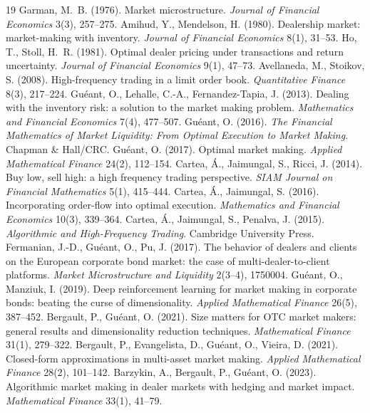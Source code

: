 \documentclass[11pt]{article}
\begin{document}
\begin{thebibliography}{19}
 Garman, M.~B. (1976). Market microstructure. \emph{Journal of Financial Economics} 3(3), 257--275.
 Amihud, Y., Mendelson, H. (1980). Dealership market: market-making with inventory. \emph{Journal of Financial Economics} 8(1), 31--53.
 Ho, T., Stoll, H.~R. (1981). Optimal dealer pricing under transactions and return uncertainty. \emph{Journal of Financial Economics} 9(1), 47--73.
 Avellaneda, M., Stoikov, S. (2008). High-frequency trading in a limit order book. \emph{Quantitative Finance} 8(3), 217--224.
 Gu\'eant, O., Lehalle, C.-A., Fernandez-Tapia, J. (2013). Dealing with the inventory risk: a solution to the market making problem. \emph{Mathematics and Financial Economics} 7(4), 477--507.
 Gu\'eant, O. (2016). \emph{The Financial Mathematics of Market Liquidity: From Optimal Execution to Market Making}. Chapman \& Hall/CRC.
 Gu\'eant, O. (2017). Optimal market making. \emph{Applied Mathematical Finance} 24(2), 112--154.
 Cartea, \'A., Jaimungal, S., Ricci, J. (2014). Buy low, sell high: a high frequency trading perspective. \emph{SIAM Journal on Financial Mathematics} 5(1), 415--444.
 Cartea, \'A., Jaimungal, S. (2016). Incorporating order-flow into optimal execution. \emph{Mathematics and Financial Economics} 10(3), 339--364.
 Cartea, \'A., Jaimungal, S., Penalva, J. (2015). \emph{Algorithmic and High-Frequency Trading}. Cambridge University Press.
 Fermanian, J.-D., Gu\'eant, O., Pu, J. (2017). The behavior of dealers and clients on the European corporate bond market: the case of multi-dealer-to-client platforms. \emph{Market Microstructure and Liquidity} 2(3--4), 1750004.
 Gu\'eant, O., Manziuk, I. (2019). Deep reinforcement learning for market making in corporate bonds: beating the curse of dimensionality. \emph{Applied Mathematical Finance} 26(5), 387--452.
 Bergault, P., Gu\'eant, O. (2021). Size matters for OTC market makers: general results and dimensionality reduction techniques. \emph{Mathematical Finance} 31(1), 279--322.
 Bergault, P., Evangelista, D., Gu\'eant, O., Vieira, D. (2021). Closed-form approximations in multi-asset market making. \emph{Applied Mathematical Finance} 28(2), 101--142.
 Barzykin, A., Bergault, P., Gu\'eant, O. (2023). Algorithmic market making in dealer markets with hedging and market impact. \emph{Mathematical Finance} 33(1), 41--79.

\end{thebibliography}
\end{document}
